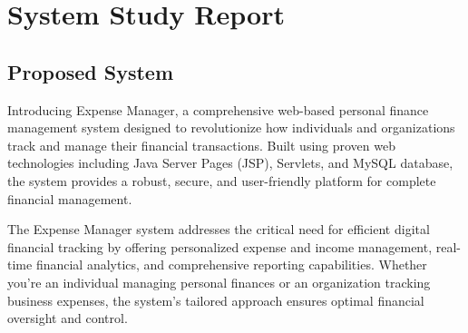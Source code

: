 \chapter{System Study Report}

\section{Proposed System}

Introducing Expense Manager, a comprehensive web-based personal finance management system designed to revolutionize how individuals and organizations track and manage their financial transactions. Built using proven web technologies including Java Server Pages (JSP), Servlets, and MySQL database, the system provides a robust, secure, and user-friendly platform for complete financial management.

The Expense Manager system addresses the critical need for efficient digital financial tracking by offering personalized expense and income management, real-time financial analytics, and comprehensive reporting capabilities. Whether you're an individual managing personal finances or an organization tracking business expenses, the system's tailored approach ensures optimal financial oversight and control.